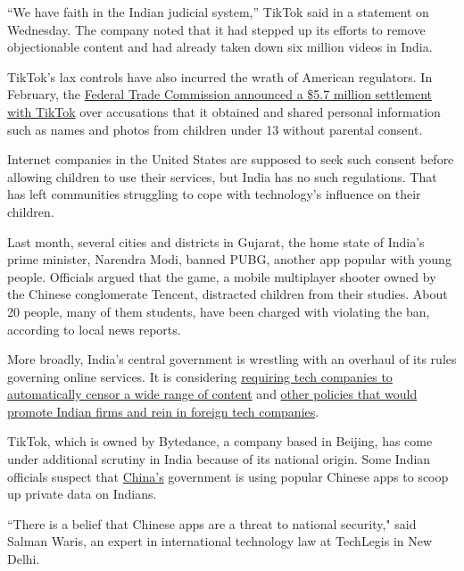 ``We have faith in the Indian judicial system,'' TikTok said in a
statement on Wednesday. The company noted that it had stepped up its
efforts to remove objectionable content and had already taken down six
million videos in India.

TikTok's lax controls have also incurred the wrath of American
regulators. In February, the
\href{https://www.nytimes.com/2019/02/27/technology/ftc-tiktok-child-privacy-fine.html?searchResultPosition=4}{Federal
Trade Commission announced a \$5.7 million settlement with TikTok} over
accusations that it obtained and shared personal information such as
names and photos from children under 13 without parental consent.

Internet companies in the United States are supposed to seek such
consent before allowing children to use their services, but India has no
such regulations. That has left communities struggling to cope with
technology's influence on their children.

Last month, several cities and districts in Gujarat, the home state of
India's prime minister, Narendra Modi, banned PUBG, another app popular
with young people. Officials argued that the game, a mobile multiplayer
shooter owned by the Chinese conglomerate Tencent, distracted children
from their studies. About 20 people, many of them students, have been
charged with violating the ban, according to local news reports.

More broadly, India's central government is wrestling with an overhaul
of its rules governing online services. It is considering
\href{https://www.nytimes.com/2019/02/14/technology/india-internet-censorship.html?searchResultPosition=1}{requiring
tech companies to automatically censor a wide range of content} and
\href{https://www.nytimes.com/2018/08/31/technology/india-technology-american-giants.html?searchResultPosition=5}{other
policies that would promote Indian firms and rein in foreign tech
companies}.

TikTok, which is owned by Bytedance, a company based in Beijing, has
come under additional scrutiny in India because of its national origin.
Some Indian officials suspect that
\href{https://www.nytimes.com/2020/06/30/technology/india-china-tiktok.html}{China's}
government is using popular Chinese apps to scoop up private data on
Indians.

``There is a belief that Chinese apps are a threat to national
security," said Salman Waris, an expert in international technology law
at TechLegis in New Delhi.


